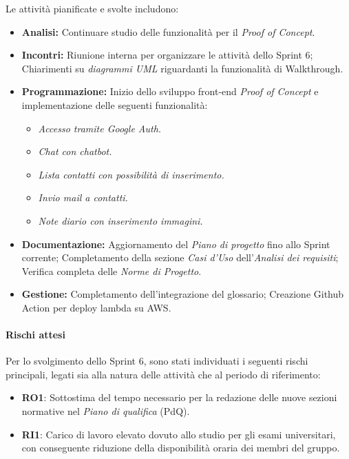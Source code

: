 \documentclass[a4paper,12pt]{article}
\begin{document}
Le attività pianificate e svolte includono:
\begin{itemize}
    \item \textbf{Analisi:} Continuare studio delle funzionalità per il \textit{Proof of Concept}.
    \item \textbf{Incontri:} Riunione interna per organizzare le attività dello Sprint 6; Chiarimenti su \textit{diagrammi UML} riguardanti la funzionalità di Walkthrough.
    \item \textbf{Programmazione:} Inizio dello sviluppo front-end \textit{Proof of Concept} e implementazione delle seguenti funzionalità:
    \begin{itemize}
        \item \textit{Accesso tramite Google Auth.}
        \item \textit{Chat con chatbot.}
        \item \textit{Lista contatti con possibilità di inserimento.}
        \item \textit{Invio mail a contatti.}
        \item \textit{Note diario con inserimento immagini.}
    \end{itemize}
    \item \textbf{Documentazione:} Aggiornamento del \textit{Piano di progetto} fino allo Sprint corrente; Completamento della sezione \textit{Casi d'Uso} dell'\textit{Analisi dei requisiti}; Verifica completa delle \textit{Norme di Progetto}.
    \item \textbf{Gestione:} Completamento dell'integrazione del glossario; Creazione Github Action per deploy lambda su AWS.
\end{itemize}

\paragraph{Rischi attesi}
Per lo svolgimento dello Sprint 6, sono stati individuati i seguenti rischi principali, legati sia alla natura delle attività che al periodo di riferimento:

\begin{itemize}
    \item \textbf{RO1}: Sottostima del tempo necessario per la redazione delle nuove sezioni normative nel \textit{Piano di qualifica} (PdQ).
    \item \textbf{RI1}: Carico di lavoro elevato dovuto allo studio per gli esami universitari, con conseguente riduzione della disponibilità oraria dei membri del gruppo.
\end{itemize}
\end{document}
